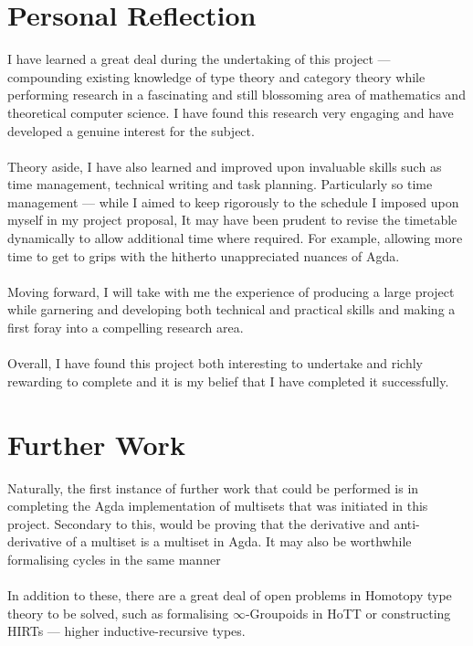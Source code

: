 \documentclass[12pt]{report}
\begin{document}
\section{Personal Reflection}
I have learned a great deal during the undertaking of this project --- compounding existing knowledge of type theory and category theory while performing research in a fascinating and still blossoming area of mathematics and theoretical computer science. I have found this research very engaging and have developed a genuine interest for the subject.\\
\\
Theory aside, I have also learned and improved upon invaluable skills such as time management, technical writing and task planning. Particularly so time management --- while I aimed to keep rigorously to the schedule I imposed upon myself in my project proposal, It may have been prudent to revise the timetable dynamically to allow additional time where required. For example, allowing more time to get to grips with the hitherto unappreciated nuances of Agda.\\
\\
Moving forward, I will take with me the experience of producing a large project while garnering and developing both technical and practical skills and making a first foray into a compelling research area.\\ 
\\
Overall, I have found this project both interesting to undertake and richly rewarding to complete and it is my belief that I have completed it successfully.

\section{Further Work}
Naturally, the first instance of further work that could be performed is in completing the Agda implementation of multisets that was initiated in this project. Secondary to this, would be proving that the derivative and anti-derivative of a multiset is a multiset in Agda. It may also be worthwhile formalising cycles in the same manner \\
\\
In addition to these, there are a great deal of open problems in Homotopy type theory to be solved, such as formalising  $\infty$-Groupoids in HoTT or constructing HIRTs --- higher inductive-recursive types. 


\cleardoublepage
{}
{}
\end{document}
